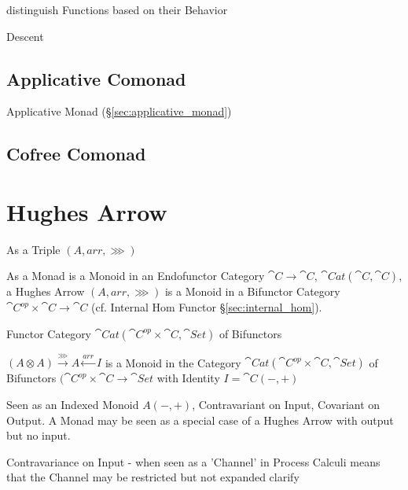 distinguish Functions based on their Behavior

Descent



\subsection{Applicative Comonad}\label{sec:applicative_comonad}

Applicative Monad (\S\ref{sec:applicative_monad})



\subsection{Cofree Comonad}\label{sec:cofree_comonad}



\section{Hughes Arrow}\label{sec:hughes_arrow}

As a Triple $(A, arr, \ggg)$

As a Monad is a Monoid in an Endofunctor Category $\cat{C} \rightarrow
\cat{C}$, $\cat{Cat}(\cat{C},\cat{C})$, a Hughes Arrow $(A, arr,
\ggg)$ is a Monoid in a Bifunctor Category $\cat{C}^{op} \times
\cat{C} \rightarrow \cat{C}$ (cf. Internal Hom Functor
\S\ref{sec:internal_hom}).

Functor Category $\cat{Cat}(\cat{C}^{op} \times \cat{C},
\cat{Set})$ of Bifunctors

$(A \otimes A) \xrightarrow{\ggg} A \xleftarrow{arr} I$ is a Monoid in
the Category $\cat{Cat} (\cat{C}^{op} \times \cat{C}, \cat{Set})$ of
Bifunctors $(\cat{C}^{op} \times \cat{C} \rightarrow \cat{Set}$ with
Identity $I = \cat{C} (-,+)$

Seen as an Indexed Monoid $A(-,+)$, Contravariant on Input, Covariant
on Output. A Monad may be seen as a special case of a Hughes Arrow
with output but no input.

Contravariance on Input - when seen as a 'Channel' in Process Calculi
means that the Channel may be restricted but not expanded %
clarify

